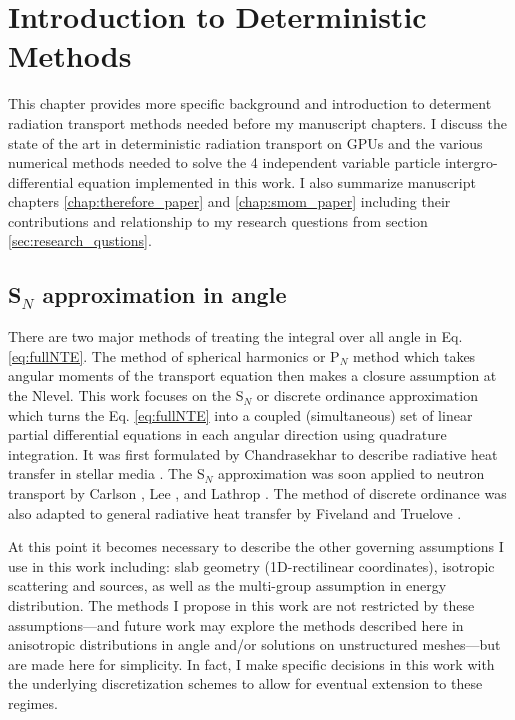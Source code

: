 \chapter{Introduction to Deterministic Methods}
\label{chap:determ_intro}

This chapter provides more specific background and introduction to determent radiation transport methods needed before my manuscript chapters.
I discuss the state of the art in deterministic radiation transport on GPUs and the various numerical methods needed to solve the 4 independent variable particle intergro-differential equation implemented in this work.
I also summarize manuscript chapters \ref{chap:therefore_paper} and \ref{chap:smom_paper} including their contributions and relationship to my research questions from section \ref{sec:research_qustions}.

\section{S$_N$ approximation in angle}

There are two major methods of treating the integral over all angle in Eq. \ref{eq:fullNTE}.
The method of spherical harmonics or P$_{N}$ method which takes angular moments of the transport equation then makes a closure assumption at the N\ths level.
This work focuses on the S$_N$ or discrete ordinance approximation which turns the Eq. \ref{eq:fullNTE} into a coupled (simultaneous) set of linear partial differential equations in each angular direction using quadrature integration.
It was first formulated by Chandrasekhar to describe radiative heat transfer in stellar media \cite{chandrasekhar1960radiative}.
The S$_N$ approximation was soon applied to neutron transport by Carlson \cite{precise1971carlson}, Lee \cite{discrete1961lee}, and Lathrop \cite{discrete1966lathnrop}.
The method of discrete ordinance was also adapted to general radiative heat transfer by Fiveland \cite{three1988fiveland} and Truelove \cite{discrete1987truelove}.

At this point it becomes necessary to describe the other governing assumptions I use in this work including:
slab geometry (1D-rectilinear coordinates), isotropic scattering and sources, as well as the multi-group assumption in energy distribution.
The methods I propose in this work are not restricted by these assumptions---and future work may explore the methods described here in anisotropic distributions in angle and/or solutions on unstructured meshes---but are made here for simplicity.
In fact, I make specific decisions in this work with the underlying discretization schemes to allow for eventual extension to these regimes.


